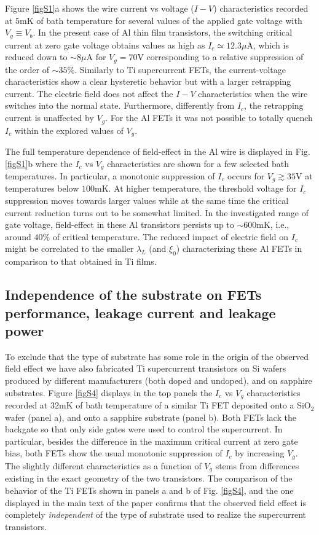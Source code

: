 \documentclass[prl,twocolumn,reprint,graphicx,showpacs,superscriptaddress,floatfix]{revtex4-1}
\begin{document}
Figure \ref{figS1}a shows the wire current vs voltage ($I-V$) characteristics recorded at $5$mK of bath temperature for several values of the applied gate voltage with $V_g\equiv V_b$. 
In the present case of Al thin film transistors, the switching critical current at zero gate voltage obtains values as high as $I_c\simeq 12.3\mu$A, which is reduced down to $\sim 8\mu$A for $V_g=70$V corresponding to a relative suppression of the order of  $\sim 35\%$. 
Similarly to Ti supercurrent FETs, the current-voltage characteristics show a clear hysteretic behavior but with a larger retrapping current.
The electric field does not affect the $I-V$ characteristics when the wire switches into the normal state. 
Furthermore, differently from $I_c$, the retrapping current is unaffected by $V_g$. 
For the Al FETs it was  not possible to totally quench $I_c$ within the explored values of $V_g$.

The full temperature dependence of field-effect in the Al wire is displayed in Fig. \ref{figS1}b where the $I_c$ vs $V_g$ characteristics are shown for a few selected bath temperatures. 
In particular,  a monotonic suppression of $I_c$ occurs for $V_g \gtrsim 35$V at temperatures below $100$mK.
At higher temperature, the threshold voltage for $I_c$ suppression moves towards larger values while at the same time the critical current reduction  turns out to be somewhat limited. In the investigated range of gate voltage,  
field-effect in these Al transistors persists up to $\sim 600$mK, i.e., around $40\%$ of critical temperature. 
The reduced impact of  electric field on $I_c$ might be correlated to the smaller $\lambda _L$ (and $\xi_0$) characterizing these Al FETs in comparison to that obtained in Ti films. 

\subsection{Independence of the substrate on FETs performance, leakage current and leakage power}

To exclude that the type of substrate has some role in the origin of the observed field effect we have also fabricated Ti supercurrent transistors on Si wafers  produced by different manufacturers (both doped and undoped), and on sapphire substrates. 
Figure \ref{figS4} displays in the  top panels the $I_c$ vs $V_g$ characteristics recorded at $32$mK of bath temperature of a similar Ti FET deposited onto a SiO$_2$ wafer (panel a), and onto a sapphire substrate (panel b). Both FETs lack the backgate so that only side gates were used to control the supercurrent.
In particular, besides the difference in the maximum critical current at zero gate bias, both FETs show the usual monotonic suppression of $I_c$ by increasing $V_g$. 
The slightly different characteristics as a function of $V_g$ stems from differences existing in the exact geometry of the two transistors. 
The comparison of the behavior of the Ti FETs shown in panels a and b of Fig. \ref{figS4},  and the one displayed in the main text of the paper confirms that the observed field effect is completely  \emph{independent} of the type of substrate used to realize the supercurrent transistors.
\end{document}
